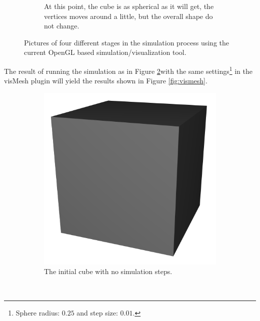 \begin{figure}
\begin{subfigure}[t]{0.4\textwidth}
                \caption{At this point, the cube is as spherical as it will get,
                         the vertices moves around a little, but the overall
                         shape do not change.}
                \label{fig:gl3}
        \end{subfigure}
        \caption{Pictures of four different stages in the simulation process using
                 the current OpenGL based simulation/visualization tool.}
        \label{fig:OpenGL}
\end{figure}

The result of running the simulation as in Figure \ref{fig:OpenGL}with the same
settings\footnote{Sphere radius: $0.25$ and step size: $0.01$.} in the visMesh
plugin will yield the results shown in Figure \ref{fig:vismesh}.

\begin{figure}
        \centering
        \begin{subfigure}[t]{0.4\textwidth}
                \includegraphics[width=\textwidth]{img/maya0.png}
                \caption{The initial cube with no simulation steps.}
                \label{fig:Maya0}
        \end{subfigure}%
        ~ %
        \begin{subfigure}[t]{0.4\textwidth}

\end{subfigure}
\end{figure}
